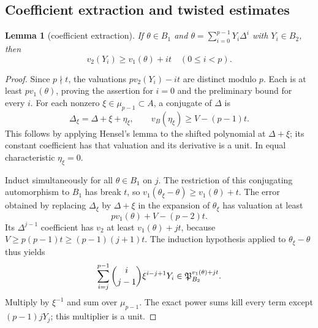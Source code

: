 \documentclass[11pt]{amsart}
\newtheorem{lemma}[theorem]{Lemma}
\theoremstyle{definition}
\theoremstyle{remark}
\begin{document}
\subsection{Coefficient extraction and twisted estimates}
\begin{lemma}[coefficient extraction]\label{O:A:lem:coeff}
If $\theta\in B_1$ and $\theta=\sum_{i=0}^{p-1}Y_i\Delta^i$ with
$Y_i\in B_2$, then
\[
 v_2(Y_i)\ge v_1(\theta)+it\quad(0\le i<p).
\]
\end{lemma}
\begin{proof}
Since $p\nmid t$, the valuations $pv_2(Y_i)-it$ are distinct modulo $p$.
Each is at least $pv_1(\theta)$, proving the assertion for $i=0$ and the
preliminary bound for every $i$.
For each nonzero $\xi\in\mu_{p-1}\subset A$, a conjugate of $\Delta$ is
\[
 \Delta_\xi=\Delta+\xi+\eta_\xi,
 \qquad v_B(\eta_\xi)\ge V-(p-1)t.
\]
This follows by applying Hensel's lemma to the shifted polynomial at
$\Delta+\xi$; its constant coefficient has that valuation and its derivative
is a unit.  In equal characteristic $\eta_\xi=0$.

Induct simultaneously for all $\theta\in B_1$ on $j$.
The restriction of this conjugating automorphism to $B_1$ has break $t$,
so $v_1(\theta_\xi-\theta)\ge v_1(\theta)+t$.
The error obtained by replacing $\Delta_\xi$ by $\Delta+\xi$ in the
expansion of $\theta_\xi$ has valuation at least
\[
 pv_1(\theta)+V-(p-2)t.
\]
Its $\Delta^{j-1}$ coefficient has $v_2$ at least $v_1(\theta)+jt$,
because $V\ge p(p-1)t\ge(p-1)(j+1)t$.
The induction hypothesis applied to $\theta_\xi-\theta$ thus yields
\[
 \sum_{i=j}^{p-1}\binom{i}{j-1}\xi^{i-j+1}Y_i
 \in\mathfrak P_{B_2}^{v_1(\theta)+jt}.
\]
Multiply by $\xi^{-1}$ and sum over $\mu_{p-1}$.
The exact power sums kill every term except $(p-1)jY_j$;
this multiplier is a unit.
\end{proof}
\end{document}
